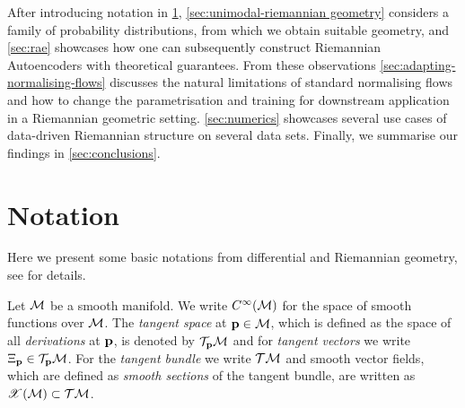 After introducing notation in \ref{sec:notation}, \ref{sec:unimodal-riemannian geometry} considers a family of probability distributions, from which we obtain suitable geometry, and \ref{sec:rae} showcases how one can subsequently construct Riemannian Autoencoders with theoretical guarantees. From these observations \ref{sec:adapting-normalising-flows} discusses the natural limitations of standard normalising flows and how to change the parametrisation and training for downstream application in a Riemannian geometric setting. \ref{sec:numerics} showcases several use cases of data-driven Riemannian structure on several data sets. Finally, we summarise our findings in \ref{sec:conclusions}.

\section{Notation}
\label{sec:notation}

Here we present some basic notations from differential and Riemannian geometry, see \cite{boothby2003introduction,carmo1992riemannian,lee2013smooth,sakai1996riemannian} for details. 

Let $\mathcal{M}$ be a smooth manifold. We write $C^\infty(\mathcal{M})$ for the space of smooth functions over $\mathcal{M}$. The \emph{tangent space} at $\mathbf{p} \in \mathcal{M}$, which is defined as the space of all \emph{derivations} at $\mathbf{p}$, is denoted by $\mathcal{T}_{\mathbf{p}} \mathcal{M}$ and for \emph{tangent vectors} we write $\Xi_{\mathbf{p}} \in \mathcal{T}_{\mathbf{p}} \mathcal{M}$. For the \emph{tangent bundle} we write $\mathcal{T}\mathcal{M}$ and smooth vector fields, which are defined as \emph{smooth sections} of the tangent bundle, are written as $\mathscr{X}(\mathcal{M}) \subset \mathcal{T}\mathcal{M}$.

